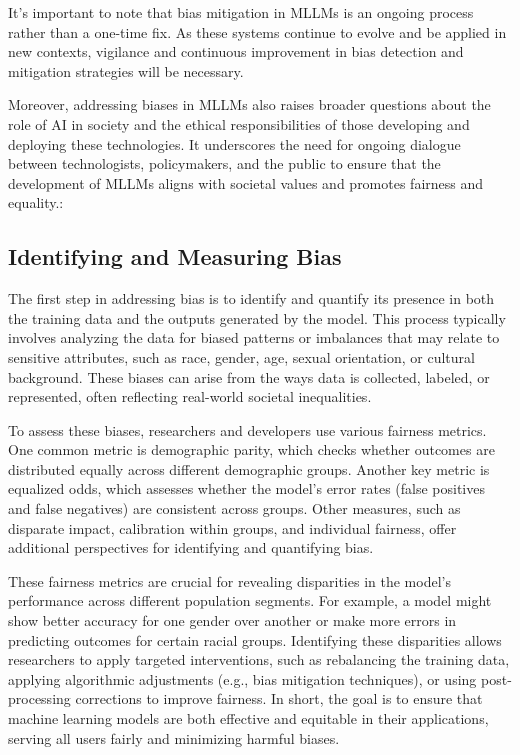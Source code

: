 It's important to note that bias mitigation in MLLMs is an ongoing process rather than a one-time fix. As these systems continue to evolve and be applied in new contexts, vigilance and continuous improvement in bias detection and mitigation strategies will be necessary.

Moreover, addressing biases in MLLMs also raises broader questions about the role of AI in society and the ethical responsibilities of those developing and deploying these technologies. It underscores the need for ongoing dialogue between technologists, policymakers, and the public to ensure that the development of MLLMs aligns with societal values and promotes fairness and equality.:

\subsection{Identifying and Measuring Bias}

The first step in addressing bias is to identify and quantify its presence in both the training data and the outputs generated by the model. This process typically involves analyzing the data for biased patterns or imbalances that may relate to sensitive attributes, such as race, gender, age, sexual orientation, or cultural background. These biases can arise from the ways data is collected, labeled, or represented, often reflecting real-world societal inequalities\cite{poulain2024bias}.

To assess these biases, researchers and developers use various fairness metrics. One common metric is demographic parity, which checks whether outcomes are distributed equally across different demographic groups. Another key metric is equalized odds, which assesses whether the model's error rates (false positives and false negatives) are consistent across groups. Other measures, such as disparate impact, calibration within groups, and individual fairness, offer additional perspectives for identifying and quantifying bias\cite{chen2023ai}.

These fairness metrics are crucial for revealing disparities in the model’s performance across different population segments. For example, a model might show better accuracy for one gender over another or make more errors in predicting outcomes for certain racial groups. Identifying these disparities allows researchers to apply targeted interventions, such as rebalancing the training data, applying algorithmic adjustments (e.g., bias mitigation techniques), or using post-processing corrections to improve fairness. In short, the goal is to ensure that machine learning models are both effective and equitable in their applications, serving all users fairly and minimizing harmful biases\cite{mehrabi2021survey}.

